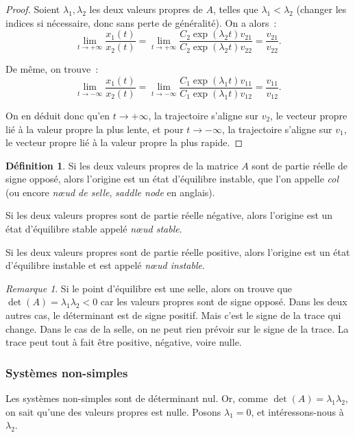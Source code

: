 \documentclass{article}
\theoremstyle{definition}
\newtheorem{déf}[thm]{Définition}
\theoremstyle{remark}
\newtheorem*{rmq}{Remarque}
\begin{document}
	\begin{proof} Soient $\lambda_1, \lambda_2$ les deux valeurs propres de $A$, telles que $\lambda_1 < \lambda_2$ (changer les indices si nécessaire, donc
	sans perte de généralité). On a alors~:
	\[\lim_{t \to +\infty}\frac {x_1(t)}{x_2(t)} = \lim_{t \to +\infty}\frac {C_2\exp(\lambda_2t)v_{21}}{C_2\exp(\lambda_2t)v_{22}} = \frac {v_{21}}{v_{22}}.\]

	De même, on trouve~:
	\[\lim_{t \to -\infty}\frac {x_1(t)}{x_2(t)} = \lim_{t \to -\infty}\frac {C_1\exp(\lambda_1t)v_{11}}{C_1\exp(\lambda_1t)v_{12}} = \frac {v_{11}}{v_{12}}.\]

	On en déduit donc qu'en $t \to +\infty$, la trajectoire s'aligne sur $v_2$, le vecteur propre lié à la valeur propre la plus lente, et pour $t \to -\infty$,
	la trajectoire s'aligne sur $v_1$, le vecteur propre lié à la valeur propre la plus rapide.
	\end{proof}

	\begin{déf} Si les deux valeurs propres de la matrice $A$ sont de partie réelle de signe opposé, alors l'origine est un état d'équilibre instable, que l'on
	appelle \textit{col} (ou encore \textit{nœud de selle}, \textit{saddle node} en anglais).

	Si les deux valeurs propres sont de partie réelle négative, alors l'origine est un état d'équilibre stable appelé \textit{nœud stable}.

	Si les deux valeurs propres sont de partie réelle positive, alors l'origine est un état d'équilibre instable et est appelé \textit{nœud instable}.
	\end{déf}

	\begin{rmq} Si le point d'équilibre est une selle, alors on trouve que $\det(A) = \lambda_1\lambda_2 < 0$ car les valeurs propres sont de signe opposé. Dans
	les deux autres cas, le déterminant est de signe positif. Mais c'est le signe de la trace qui change. Dans le cas de la selle, on ne peut rien prévoir sur
	le signe de la trace. La trace peut tout à fait être positive, négative, voire nulle.
	\end{rmq}

	\subsubsection{Systèmes non-simples}

	Les systèmes non-simples sont de déterminant nul. Or, comme $\det(A) = \lambda_1\lambda_2$, on sait qu'une des valeurs propres est nulle. Posons
	$\lambda_1 = 0$, et intéressons-nous à $\lambda_2$.
\end{document}
